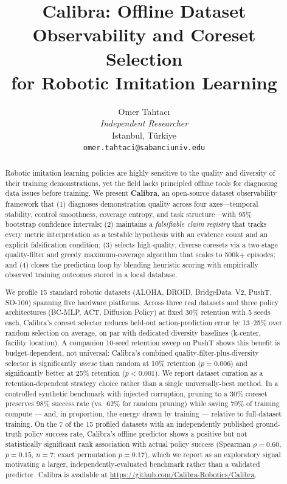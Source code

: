 \documentclass[10pt,twocolumn]{article}
\title{%
  \textbf{Calibra: Offline Dataset Observability and Coreset Selection\\
  for Robotic Imitation Learning}%
}
\author{%
  Omer Tahtac\i\\
  \textit{Independent Researcher}\\
  Istanbul, T\"urkiye\\
  \texttt{omer.tahtaci@sabanciuniv.edu}
}
\date{}
\begin{document}
\maketitle

\begin{abstract}
Robotic imitation learning policies are highly sensitive to the quality and
diversity of their training demonstrations, yet the field lacks principled
offline tools for diagnosing data issues before training.
We present \textbf{Calibra}, an open-source dataset observability framework
that (1) diagnoses demonstration quality across four axes---temporal
stability, control smoothness, coverage entropy, and task structure---with
95\% bootstrap confidence intervals; (2) maintains a \emph{falsifiable claim
registry} that tracks every metric interpretation as a testable hypothesis
with an evidence count and an explicit falsification condition; (3) selects
high-quality, diverse coresets via a two-stage quality-filter and greedy
maximum-coverage algorithm that scales to 500k+ episodes; and (4) closes the
prediction loop by blending heuristic scoring with empirically observed
training outcomes stored in a local database.

We profile 15 standard robotic datasets (ALOHA, DROID, BridgeData~V2, PushT,
SO-100) spanning five hardware platforms. Across three real datasets and
three policy architectures (BC-MLP, ACT, Diffusion Policy) at fixed 30\%
retention with 5 seeds each, Calibra's coreset selector reduces held-out
action-prediction error by 13--25\% over random selection on average, on par
with dedicated diversity baselines (k-center, facility location). A companion
10-seed retention sweep on PushT shows this benefit is budget-dependent, not
universal: Calibra's combined quality-filter-plus-diversity selector is
significantly \emph{worse} than random at 10\% retention ($p=0.006$) and
significantly better at 25\% retention ($p<0.001$). We report dataset
curation as a retention-dependent strategy choice rather than a single
universally-best method. In a controlled synthetic benchmark with injected
corruption, pruning to a 30\% coreset preserves 98\% success rate (vs.\ 62\%
for random pruning) while saving 70\% of training compute --- and, in
proportion, the energy drawn by training --- relative to full-dataset
training. On the 7 of the 15 profiled datasets with an independently
published ground-truth policy success rate, Calibra's offline predictor
shows a positive but not statistically significant rank association with
actual policy success (Spearman $\rho = 0.60$, $p = 0.15$, $n = 7$; exact
permutation $p = 0.17$), which we report as an exploratory signal motivating
a larger, independently-evaluated benchmark rather than a validated
predictor.
Calibra is available at \url{https://github.com/Calibra-Robotics/Calibra}.
\end{abstract}
\end{document}
